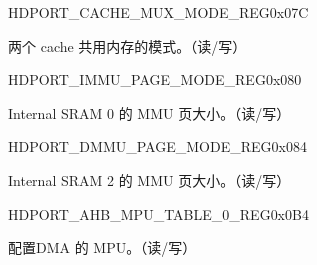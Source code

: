 \begin{register}{H}{DPORT\_CACHE\_MUX\_MODE\_REG}{0x07C}\label{regdesc:CACHEMUXMODEREG}
%
%
\regnewline%
\begin{regdesc}\begin{reglist}
\item [DPORT\_CACHE\_MUX\_MODE]两个 cache 共用内存的模式。（读/写）
\end{reglist}\end{regdesc}
\end{register}


\begin{register}{H}{DPORT\_IMMU\_PAGE\_MODE\_REG}{0x080}\label{regdesc:IMMUPAGEMODEREG}
%
%
%
\regnewline%
\begin{regdesc}\begin{reglist}
\item [DPORT\_IMMU\_PAGE\_MODE]Internal SRAM 0 的 MMU 页大小。（读/写）
\end{reglist}\end{regdesc}
\end{register}


\begin{register}{H}{DPORT\_DMMU\_PAGE\_MODE\_REG}{0x084}\label{regdesc:DMMUPAGEMODEREG}
%
%
%
\regnewline%
\begin{regdesc}\begin{reglist}
\item [DPORT\_DMMU\_PAGE\_MODE]Internal SRAM 2 的 MMU 页大小。（读/写）
\end{reglist}\end{regdesc}
\end{register}





\begin{register}{H}{DPORT\_AHB\_MPU\_TABLE\_0\_REG}{0x0B4}\label{regdesc:AHBMPUTABLE0REG}
%
\regnewline%
\begin{regdesc}\begin{reglist}
\item [DPORT\_AHB\_MPU\_TABLE\_0\_REG] 配置DMA 的 MPU。（读/写）
\end{reglist}\end{regdesc}
\end{register}


